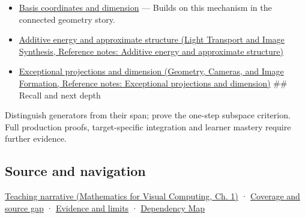\hypertarget{appendix-173b52c063ae-used-by}{}

\begin{itemize}
\item
  \hyperref[appendix-ce0341f7ea0d]{Basis coordinates and dimension} --- Builds on this mechanism in the connected geometry story.
\item
  \href{../04-Light-Transport-and-Image-Synthesis/main.pdf\#nameddest=appendix-b0732b22e7d6}{Additive energy and approximate structure (Light Transport and Image Synthesis, Reference notes: Additive energy and approximate structure)}
\item
  \href{../03-Geometry-Cameras-and-Image-Formation/main.pdf\#nameddest=appendix-3c73f7862157}{Exceptional projections and dimension (Geometry, Cameras, and Image Formation, Reference notes: Exceptional projections and dimension)} \#\# Recall and next depth
\end{itemize}

Distinguish generators from their span; prove the one-step subspace criterion. Full production proofs, target-specific integration and learner mastery require further evidence.

\subsection{Source and navigation}\label{appendix-173b52c063ae-source-and-navigation}

\hypertarget{appendix-173b52c063ae-source-and-navigation}{}

\href{../02-Mathematics-for-Visual-Computing/main.pdf\#nameddest=01-foundations-i-ch017-the-reachable-movements-form-a-vector-space}{Teaching narrative (Mathematics for Visual Computing, Ch. 1)} · \hyperref[appendix-fd090d982a15-phase-6---parts-501-600]{Coverage and source gap} · \hyperref[appendix-a103e7846d21-phase-6---source-analysis-and-verification]{Evidence and limits} · \hyperref[appendix-4ad47bdd269a]{Dependency Map}
